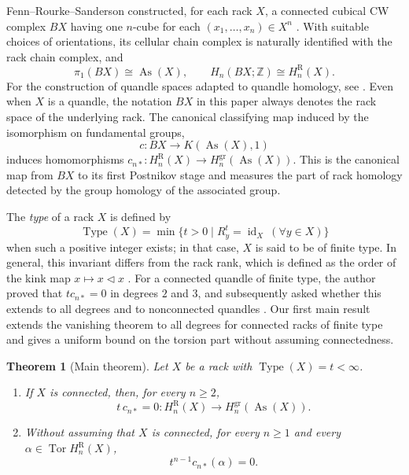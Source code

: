 \documentclass[11pt]{article}
\newtheorem{theorem}{Theorem}[section]
\DeclareMathOperator{\As}{As}
\DeclareMathOperator{\Tor}{Tor}
\DeclareMathOperator{\Type}{Type}
\newcommand{\ZZ}{\mathbb Z}
\newcommand{\gr}{\mathrm{gr}}
\newcommand{\R}{\mathrm R}
\begin{document}
Fenn--Rourke--Sanderson constructed, for each rack $X$, a connected cubical CW complex $BX$ having one $n$-cube for each $(x_1,\ldots,x_n)\in X^n$ \cite{FRSTrunks,FRS}. With suitable choices of orientations, its cellular chain complex is naturally identified with the rack chain complex, and
\[
        \pi_1(BX)\cong\As(X),
        \qquad
        H_n(BX;\ZZ)\cong H_n^\R(X).
\]
For the construction of quandle spaces adapted to quandle homology, see \cite{NosakaQuandleSpace,NosakaHomotopical}. Even when $X$ is a quandle, the notation $BX$ in this paper always denotes the rack space of the underlying rack. The canonical classifying map induced by the isomorphism on fundamental groups,
\begin{equation}
        c\colon BX\longrightarrow K(\As(X),1)
        \label{eq:classifying-map-intro}
\end{equation}
induces homomorphisms $c_{n*}\colon H_n^\R(X)\to H_n^{\gr}(\As(X))$. This is the canonical map from $BX$ to its first Postnikov stage and measures the part of rack homology detected by the group homology of the associated group.

The \emph{type} of a rack $X$ is defined by
\[
 \Type(X)=\min\{t>0\mid R_y^t=\operatorname{id}_X\ (\forall y\in X)\}
\]
when such a positive integer exists; in that case, $X$ is said to be of finite type. In general, this invariant differs from the rack rank, which is defined as the order of the kink map $x\mapsto x\lhd x$ \cite{ElhamdadiNelsonRank}. For a connected quandle of finite type, the author proved that $t c_{n*}=0$ in degrees $2$ and $3$, and subsequently asked whether this extends to all degrees and to nonconnected quandles \cite[Theorem~6.1 and the problem immediately following it]{NosakaAdjoint}. Our first main result extends the vanishing theorem to all degrees for connected racks of finite type and gives a uniform bound on the torsion part without assuming connectedness.

\begin{theorem}[Main theorem]
\label{thm:main}
Let $X$ be a rack with $\Type(X)=t<\infty$.
\begin{enumerate}[label=(\arabic*)]
\item If $X$ is connected, then, for every $n\ge2$,
\[
        t\,c_{n*}=0
        \colon H_n^\R(X)\longrightarrow H_n^{\gr}(\As(X)).
\]
\item Without assuming that $X$ is connected, for every $n\ge1$ and every
$\alpha\in\Tor H_n^\R(X)$,
\[
        t^{n-1}c_{n*}(\alpha)=0.
\]
\end{enumerate}
\end{theorem}
\end{document}
